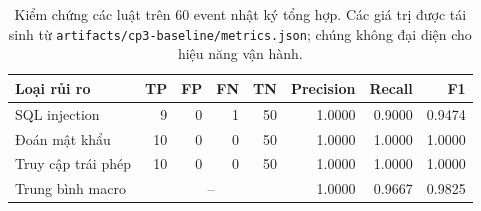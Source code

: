 \begin{table}[t]
  \centering
  \caption{Kiểm chứng các luật trên 60 event nhật ký tổng hợp. Các giá trị được tái sinh từ \texttt{artifacts/cp3-baseline/metrics.json}; chúng không đại diện cho hiệu năng vận hành.}
  \label{tab:baseline-results}
  \begin{tabular}{lrrrrrrr}
    \toprule
    Loại rủi ro & TP & FP & FN & TN & Precision & Recall & F1 \\
    \midrule
    SQL injection & 9 & 0 & 1 & 50 & 1.0000 & 0.9000 & 0.9474 \\
    Đoán mật khẩu & 10 & 0 & 0 & 50 & 1.0000 & 1.0000 & 1.0000 \\
    Truy cập trái phép & 10 & 0 & 0 & 50 & 1.0000 & 1.0000 & 1.0000 \\
    \midrule
    Trung bình macro & \multicolumn{4}{c}{--} & 1.0000 & 0.9667 & 0.9825 \\
    \bottomrule
  \end{tabular}
\end{table}
